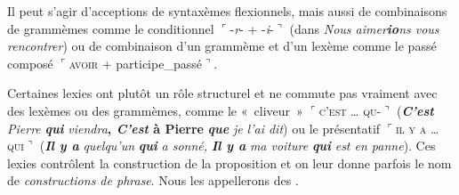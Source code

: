 Il peut s’agir d’acceptions de syntaxèmes flexionnels, mais aussi de combinaisons de grammèmes comme le conditionnel  $⌜${}-\textit{r}{}- + -\textit{i}{}-$⌝$ (dans \textit{Nous aimer}\textbf{\textit{io}}\textit{ns vous rencontrer}) ou de combinaison d’un grammème et d’un lexème comme le passé composé $⌜$\textsc{avoir} + participe\_passé$⌝$.

Certaines lexies ont plutôt un rôle structurel et ne commute pas vraiment avec des lexèmes ou des grammèmes, comme le «~cliveur~» $⌜$\textsc{c’est} \textsc{…} \textsc{qu-}$⌝$ (\textbf{\textit{C’est}} \textit{Pierre} \textbf{\textit{qui}} \textit{viendra}\textbf{, \textit{C’est} à Pierre} \textbf{\textit{que}} \textit{je l’ai dit}) ou le présentatif $⌜$\textsc{il} \textsc{y} \textsc{a} \textsc{…} \textsc{qui}$⌝$ (\textbf{\textit{Il y a}} \textit{quelqu’un} \textbf{\textit{qui}} \textit{a sonné,} \textbf{\textit{Il y a}} \textit{ma voiture} \textbf{\textit{qui}} \textit{est en panne}). Ces lexies contrôlent la construction de la proposition et on leur donne parfois le nom de \textit{constructions de phrase}. Nous les appellerons des .

